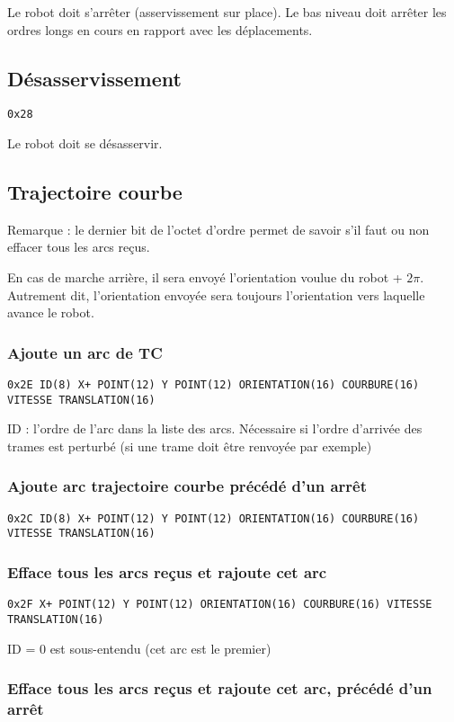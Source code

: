 \documentclass[a4paper, 12pt]{article}
\begin{document}
Le robot doit s'arrêter (asservissement sur place). Le bas niveau doit arrêter les ordres longs en cours en rapport avec les déplacements.

\subsection{Désasservissement}
    \texttt{0x28}

Le robot doit se désasservir.

\subsection{Trajectoire courbe}

Remarque : le dernier bit de l'octet d'ordre permet de savoir s'il faut ou non effacer tous les arcs reçus.

En cas de marche arrière, il sera envoyé l'orientation voulue du robot + $2\pi$. Autrement dit, l'orientation envoyée sera toujours l'orientation vers laquelle avance le robot.

\subsubsection{Ajoute un arc de TC}

\texttt{0x2E ID(8) X+ POINT(12) Y POINT(12) ORIENTATION(16) COURBURE(16) VITESSE  TRANSLATION(16)}
    
ID : l'ordre de l'arc dans la liste des arcs. Nécessaire si l'ordre d'arrivée des trames est perturbé (si une trame doit être renvoyée par exemple)
    
\subsubsection{Ajoute arc trajectoire courbe précédé d'un arrêt}

\texttt{0x2C ID(8) X+ POINT(12) Y POINT(12) ORIENTATION(16) COURBURE(16) VITESSE TRANSLATION(16)}

\subsubsection{Efface tous les arcs reçus et rajoute cet arc}

\texttt{0x2F X+ POINT(12) Y POINT(12) ORIENTATION(16) COURBURE(16) VITESSE TRANSLATION(16)}
    
ID = 0 est sous-entendu (cet arc est le premier)
    
\subsubsection{Efface tous les arcs reçus et rajoute cet arc, précédé d'un arrêt} 
\end{document}
